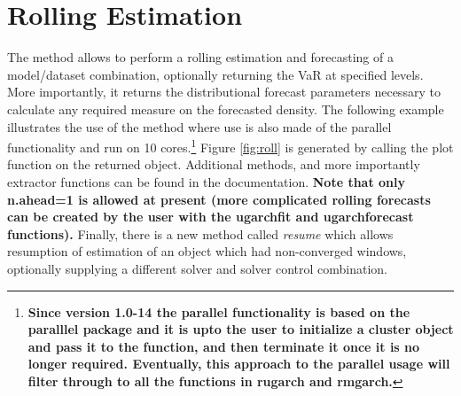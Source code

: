 \section{Rolling Estimation}\label{section:rolling}
The \verb@ugarchroll@ method allows to perform a rolling estimation and
forecasting of a model/dataset combination, optionally returning the VaR at
specified levels. More importantly, it returns the distributional forecast
parameters necessary to calculate any required measure on the forecasted
density. The following example illustrates the use of the method where use is
also made of the parallel functionality and run on 10 cores.\footnote{\textbf{Since version 1.0-14
the parallel functionality is based on the paralllel package and it is upto the
user to initialize a cluster object and pass it to the function, and then terminate
it once it is no longer required. Eventually, this approach to the parallel usage
will filter through to all the functions in rugarch and rmgarch.}}
Figure \ref{fig:roll} is generated by calling the plot function on the
returned \verb@uGARCHroll@ object. Additional methods, and more importantly
extractor functions can be found in the documentation. \textbf{Note that only n.ahead=1 is allowed at
present (more complicated rolling forecasts can be created by the user with
the ugarchfit and ugarchforecast functions).} Finally, there is a new method
called \emph{resume} which allows resumption of estimation of an object which had
non-converged windows, optionally supplying a different solver and solver control
combination.
